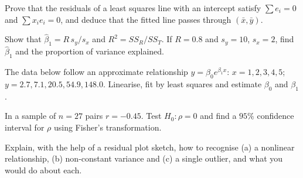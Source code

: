 \begin{exercise}
Prove that the residuals of a least squares line with an intercept satisfy $\sum e_i=0$ and $\sum x_ie_i=0$, and deduce that the fitted line passes through $(\bar{x},\bar{y})$.
\end{exercise}

\begin{exercise}
Show that $\hat\beta_1=R\,s_y/s_x$ and $R^2=SS_R/SS_T$. If $R=0.8$ and $s_y=10$, $s_x=2$, find $\hat\beta_1$ and the proportion of variance explained.
\end{exercise}

\begin{exercise}
The data below follow an approximate relationship $y=\beta_0e^{\beta_1x}$: $x=1,2,3,4,5$; $y=2.7,7.1,20.5,54.9,148.0$. Linearise, fit by least squares and estimate $\beta_0$ and $\beta_1$.
\end{exercise}

\begin{exercise}
In a sample of $n=27$ pairs $r=-0.45$. Test $H_0:\rho=0$ and find a $95\%$ confidence interval for $\rho$ using Fisher's transformation.
\end{exercise}

\begin{exercise}
Explain, with the help of a residual plot sketch, how to recognise (a) a nonlinear relationship, (b) non-constant variance and (c) a single outlier, and what you would do about each.
\end{exercise}
